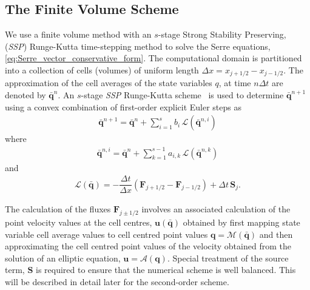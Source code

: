 \documentclass[preprint,sort&compress,1p]{article}
\begin{document}
\subsection{The Finite Volume Scheme}

We use a finite volume method  with an $s$-stage Strong Stability Preserving, (\emph{SSP}) Runge-Kutta time-stepping method to solve the Serre equations, \eqref{eq:Serre_vector_conservative_form}.
The computational domain is partitioned into a collection of cells (volumes) of uniform length $\Delta x = x_{j+1/2} - x_{j-1/2}$. The  approximation of the cell averages of the state variables $q$, at time $n \Delta t$ are denoted by $\bar{\mathbf{q}}^n$. An $s$-stage \emph{SSP} Runge-Kutta scheme~\cite{Shu-Osher-1988-439,MacDonald-etal-2008-89} is used to determine $\bar{\mathbf{q}}^{n+1}$  using a convex combination of first-order explicit Euler steps as
\begin{align}
\bar{\mathbf{q}}^{n+1} = \bar{\mathbf{q}}^n + \sum_{i=1}^s b_i \,\mathcal{L}(\bar{\mathbf{q}}^{n,i})
\end{align}
where
\begin{align}
\bar{\mathbf{q}}^{n,i} = \bar{\mathbf{q}}^n + \sum_{k=1}^{s-1} a_{i,k} \, \mathcal{L}(\bar{\mathbf{q}}^{n,k})
\end{align}
and
\begin{align}
\label{eq:L_operator}
\mathcal{L}(\bar{\mathbf{q}}) = - \dfrac{\Delta t}{\Delta x} \left ( \mathbf{F}_{j+1/2} - \mathbf{F}_{j-1/2} \right ) + \Delta t \,\mathbf{S}_j.
\end{align}

The calculation of the fluxes $\mathbf{F}_{j\pm1/2}$ involves an associated calculation of the point velocity values at the cell centres, $\mathbf{u}\left(\mathbf{\bar{q}}\right)$ obtained by first mapping state variable cell average values to cell centred point values
$\mathbf{q} = \mathcal{M}\left(\mathbf{\bar{q}} \right) $  and then approximating the cell centred point  values of the velocity obtained from the solution of an elliptic equation,
$\mathbf{u} = \mathcal{A}\left(\mathbf{q} \right)$.
Special treatment of the source term, $\mathbf{S}$ is required to ensure that the numerical scheme is well balanced. This will be described in detail later for the second-order scheme.
\end{document}

